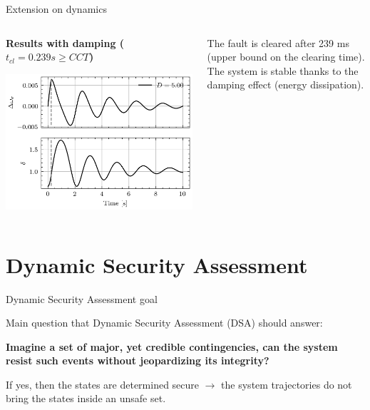 \begin{frame}{Extension on dynamics}
\begin{columns}
    \begin{column}{0.55\textwidth}
        \textbf{Results with damping ($t_{cl} = 0.239 s \geq CCT$)}
        \begin{center}
        \includegraphics[width=0.9\linewidth]{images/P-dynamics_bis_failed.png}
        \end{center}
    \end{column}
    \begin{column}{0.45\textwidth}
        The fault is cleared after 239 ms (upper bound on the clearing time). The system is stable thanks to the damping effect (energy dissipation).
    \end{column}
\end{columns}
\end{frame}

\section{{Dynamic Security Assessment}}
\begin{frame}{Dynamic Security Assessment goal}

    Main question that Dynamic Security Assessment (DSA) should answer:

\textbf{Imagine a set of major, yet credible contingencies, can the system resist such events without jeopardizing its integrity?}

If yes, then the states are determined secure $\rightarrow$ the system trajectories do not bring the states inside an unsafe set.
\end{frame}

